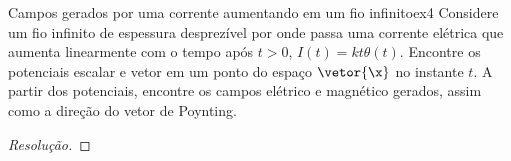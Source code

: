 \begin{exercício}{Campos gerados por uma corrente aumentando em um fio infinito}{ex4}
   Considere um fio infinito de espessura desprezível por onde passa uma corrente elétrica que aumenta linearmente com o tempo após \(t > 0\), \(I(t) = kt\theta(t)\). Encontre os potenciais escalar e vetor em um ponto do espaço \(\vetor{\x}\) no instante \(t\). A partir dos potenciais, encontre os campos elétrico e magnético gerados, assim como a direção do vetor de Poynting.
\end{exercício}
\begin{proof}[Resolução]
    
\end{proof}
